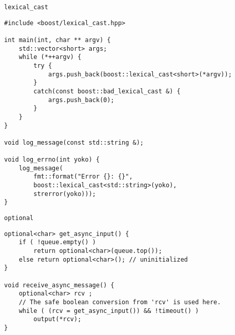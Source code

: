 \documentclass{beamer}
\begin{document}
\begin{frame}[fragile]{{\tt lexical\_cast}}
\small
\begin{lstlisting}
#include <boost/lexical_cast.hpp>

int main(int, char ** argv) {
    std::vector<short> args;
    while (*++argv) {
        try {
            args.push_back(boost::lexical_cast<short>(*argv));
        }
        catch(const boost::bad_lexical_cast &) {
            args.push_back(0);
        }
    }
} 

void log_message(const std::string &);

void log_errno(int yoko) {
    log_message(
        fmt::format("Error {}: {}",
        boost::lexical_cast<std::string>(yoko),
        strerror(yoko)));
}
\end{lstlisting}
\end{frame}


\begin{frame}[fragile]{{\tt optional}}
\small
\begin{lstlisting}
optional<char> get_async_input() {
    if ( !queue.empty() )
        return optional<char>(queue.top());
    else return optional<char>(); // uninitialized
}

void receive_async_message() {
    optional<char> rcv ;
    // The safe boolean conversion from 'rcv' is used here.
    while ( (rcv = get_async_input()) && !timeout() )
        output(*rcv);
}
\end{lstlisting}
\end{frame}
\end{document}
